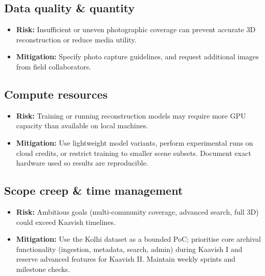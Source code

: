 \subsection{Data quality \& quantity}
\begin{itemize}
  \item \textbf{Risk:} Insufficient or uneven photographic coverage can prevent accurate 3D reconstruction or reduce media utility.
  \item \textbf{Mitigation:} Specify photo capture guidelines, and request additional images from field collaborators.
\end{itemize}

\subsection{Compute resources}
\begin{itemize}
  \item \textbf{Risk:} Training or running reconstruction models may require more GPU capacity than available on local machines.
  \item \textbf{Mitigation:} Use lightweight model variants, perform experimental runs on cloud credits, or restrict training to smaller scene subsets. Document exact hardware used so results are reproducible.
\end{itemize}

\subsection{Scope creep \& time management}
\begin{itemize}
  \item \textbf{Risk:} Ambitious goals (multi-community coverage, advanced search, full 3D) could exceed Kaavish timelines.
  \item \textbf{Mitigation:} Use the Kolhi dataset as a bounded PoC; prioritise core archival functionality (ingestion, metadata, search, admin) during Kaavish I and reserve advanced features for Kaavish II. Maintain weekly sprints and milestone checks.
\end{itemize}
